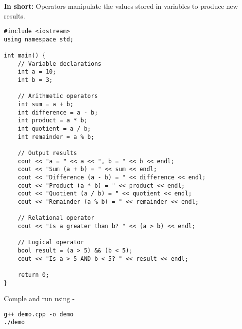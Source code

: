 \documentclass{article}
\begin{document}
\noindent\textbf{In short:} Operators manipulate the values stored in variables to produce new results.

\begin{lstlisting}[style=cppstyle]
#include <iostream>
using namespace std;

int main() {
    // Variable declarations
    int a = 10;
    int b = 3;

    // Arithmetic operators
    int sum = a + b;
    int difference = a - b;
    int product = a * b;
    int quotient = a / b;
    int remainder = a % b;

    // Output results
    cout << "a = " << a << ", b = " << b << endl;
    cout << "Sum (a + b) = " << sum << endl;
    cout << "Difference (a - b) = " << difference << endl;
    cout << "Product (a * b) = " << product << endl;
    cout << "Quotient (a / b) = " << quotient << endl;
    cout << "Remainder (a % b) = " << remainder << endl;

    // Relational operator
    cout << "Is a greater than b? " << (a > b) << endl;

    // Logical operator
    bool result = (a > 5) && (b < 5);
    cout << "Is a > 5 AND b < 5? " << result << endl;

    return 0;
}
\end{lstlisting}

Comple and run using - 
\begin{verbatim}
g++ demo.cpp -o demo
./demo  
\end{verbatim}
\end{document}
